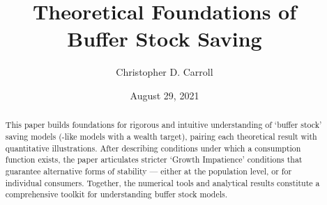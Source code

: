 \documentclass[BufferStockTheory]{subfiles}
\begin{document}
\providecommand{\versn}{pdf} %
\ifthenelse{\boolean{Web}}{    %
  \renewcommand{\versn}{Web}     %
  \renewcommand{\rootFromOut}{.} %
}{}  %


\title{Theoretical Foundations of \\ Buffer Stock Saving}

\author{Christopher D. Carroll\authNum}



\renewcommand{\forcedate}{August 29, 2021}\date{\forcedate}

\maketitle
\hypertarget{abstract}{}
\begin{abstract}
This paper builds foundations for rigorous and intuitive understanding of `buffer stock' saving models (\cite{bewleyPIH}-like models with a wealth target), pairing each theoretical result with quantitative illustrations.  After describing conditions under which a consumption function exists, the paper articulates stricter `Growth Impatience' conditions that guarantee alternative forms of stability --- either at the population level, or for individual consumers.  Together, the numerical tools and analytical results constitute a comprehensive toolkit for understanding buffer stock models.
\end{abstract}


\hypertarget{links}{}
\end{document}
